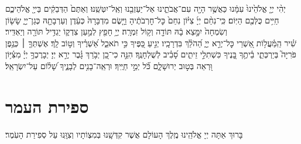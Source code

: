 \documentclass[twoside, openany, parskip=half, 11pt]{book}
\begin{document}
\begin{footnotesize}
%
יְהִ֨י יְיָ֤ אֱלֹהֵ֙ינוּ֙ עִמָּ֔נוּ כַּאֲשֶׁ֥ר הָיָ֖ה עִם־אֲבֹתֵ֑ינוּ אַל־יַעַזְבֵ֖נוּ וְאַֽל־יִטְּשֵֽׁנוּ׃
%
וְאַתֶּם֙ הַדְּבֵקִ֔ים בַּייָ֖ אֱלֹהֵיכֶ֑ם חַיִּ֥ים כֻּלְּכֶ֖ם הַיּֽוֹם׃
%
כִּֽי־נִחַ֨ם יְיָ֜ צִיּ֗וֹן נִחַם֙ כׇּל־חׇרְבֹתֶ֔יהָ וַיָּ֤שֶׂם מִדְבָּרָהּ֙ כְּעֵ֔דֶן וְעַרְבָתָ֖הּ כְּגַן־יְיָ֑ שָׂשׂ֤וֹן וְשִׂמְחָה֙ יִמָּ֣צֵא בָ֔הּ תּוֹדָ֖ה וְק֥וֹל זִמְרָֽה׃
%
יְיָ֥ חָפֵ֖ץ לְמַ֣עַן צִדְק֑וֹ יַגְדִּ֥יל תּוֹרָ֖ה וְיַאְדִּֽיר׃\\
%
שִׁ֗יר הַֽמַּ֫עֲל֥וֹת אַ֭שְׁרֵי כׇּל־יְרֵ֣א יְיָ֑ הַ֝הֹלֵ֗ךְ בִּדְרָכָֽיו׃
יְגִ֣יעַ כַּ֭פֶּיךָ כִּ֣י תֹאכֵ֑ל אַ֝שְׁרֶ֗יךָ וְט֣וֹב לָֽךְ׃
אֶשְׁתְּךָ֤ ׀ כְּגֶ֥פֶן פֹּרִיָּה֮ בְּיַרְכְּתֵ֢י בֵ֫יתֶ֥ךָ בָּ֭נֶיךָ כִּשְׁתִלֵ֣י זֵיתִ֑ים סָ֝בִ֗יב לְשֻׁלְחָנֶֽךָ׃
הִנֵּ֣ה כִי־כֵ֭ן יְבֹ֥רַךְ גָּ֗בֶר יְרֵ֣א יְיָ׃
יְבָרֶכְךָ֥ יְיָ֗ מִצִּ֫יּ֥וֹן וּ֭רְאֵה בְּט֣וּב יְרוּשָׁלָ֑‍ִם כֹּ֗֝ל יְמֵ֣י חַיֶּֽיךָ׃
וּרְאֵֽה־בָנִ֥ים לְבָנֶ֑יךָ שָׁ֝ל֗וֹם עַל־יִשְׂרָאֵֽל׃
\end{footnotesize}
\section[ספירת העמר]{ ספירת העמר }
\newcommand{\omerend}{בָּעֹֽמֶר}

\label{sefiras haomer}


בָּרוּךְ אַתָּה יְיָ אֱלֹהֵֽינוּ מֶֽלֶךְ הָעוֹלָם אֲשֶׁר קִדְּשָֽׁנוּ בְּמִצְוֹתָיו וְצִוָּֽנוּ עַל סְפִירַת הָעֹֽמֶר׃\\
\end{document}
